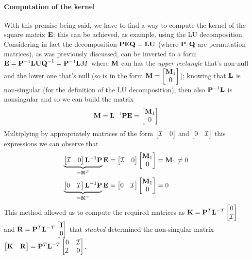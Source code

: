 	\paragraph{Computation of the kernel} With this premise being said, we have to find a way to compute the kernel of the square matrix $\mathbf{E}$; this can be achieved, as example, using the LU decomposition. Considering in fact the decomposition $\mathbf{PEQ} = \mathbf{LU}$ (where $\mathbf{P}, \mathbf{Q}$ are permutation matrices), as was previously discussed, can be inverted to a form $\mathbf{E} = \mathbf{P}^{-1} \mathbf{LUQ}^{-1} = \mathbf{P}^{-1} \mathbf{L} M$ where $\mathbf{M}$ can has the \textit{upper rectangle} that's non-null and the lower one that's null (so is in the form $\mathbf{M} = \begin{bmatrix} \mathbf{M}_1 \\ 0 \end{bmatrix}$); knowing that $\mathbf{L}$ is non-singular (for the definition of the LU decomposition), then also $\mathbf{P}^{-1} \mathbf{L}$ is nonsingular and so we can build the matrix
	\[ \mathbf{M} = \mathbf{L}^{-1} \mathbf{PE} = \begin{bmatrix} \mathbf{M}_1 \\ 0 \end{bmatrix} \]
	Multiplying by appropriately matrices of the form $\begin{bmatrix} \mathcal I & 0  \end{bmatrix}$ and $\begin{bmatrix} 0 & \mathcal I \end{bmatrix}$ this expressions we can observe that 
	\begin{align*}
		\underbrace{\begin{bmatrix} \mathcal I & 0  \end{bmatrix} \mathbf{L}^{-1} \mathbf{P}}_{=\mathbf{R}^T} \mathbf{E} = \begin{bmatrix} \mathcal I & 0 \end{bmatrix} \begin{bmatrix} \mathbf{M}_1 \\ 0 \end{bmatrix} & = \mathbf{M}_1 \neq 0 \\
		\underbrace{\begin{bmatrix} 0 & \mathcal I  \end{bmatrix} \mathbf{L}^{-1} \mathbf{P}}_{=\mathbf{K}^T}  \mathbf{E} = \begin{bmatrix} 0 & \mathcal I  \end{bmatrix} \begin{bmatrix} \mathbf{M}_1 \\ 0 \end{bmatrix} & = 0 
	\end{align*}
	This method allowed us to compute the required matrices as $\mathbf{K} = \mathbf{P}^T \mathbf{L}^{-T} \begin{bmatrix} 0 \\ \mathcal I \end{bmatrix}$ and $\mathbf{R} = \mathbf{P}^T \mathbf{L}^{-T} \begin{bmatrix} \mathbf{I} \\ 0 \end{bmatrix}$ that \textit{stacked} determined the non-singular matrix $\begin{bmatrix} \mathbf{K} & \mathbf{R} \end{bmatrix} = \mathbf{P}^T \mathbf{L}^{-T} \begin{bmatrix} 0 & \mathcal I \\ \mathcal I & 0 \end{bmatrix}$.
	
	
	
	
	
	
	
	
	
	